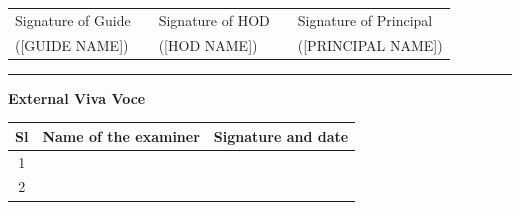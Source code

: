 \documentclass[../Project-Report-Main.tex]{subfiles}
\begin{document}
\noindent 
\begin{tabular}{p{1.75in} p{0.25in} p{1.75in} p{0.25in} p{1.75in}}
Signature of Guide & & Signature of HOD & & Signature of Principal \\
([GUIDE NAME]) & & ([HOD NAME]) & & ([PRINCIPAL NAME])
\end{tabular}

\vspace{0.1in}

\par\noindent\rule{\textwidth}{1pt}
\begin{center} \textbf{External Viva Voce} \end{center}

\begin{table}[htbp]
  \centering
   \begin{tabular}{|c|p{3in}|p{2in}|}
    \hline
    \multicolumn{1}{|l|}{Sl} & \multicolumn{1}{l|}{Name of the examiner} & \multicolumn{1}{l|}{Signature and date} \\
    \hline
    \multirow{2}[2]{*}{1} & \multirow{2}[2]{*}{} & \multirow{2}[2]{*}{} \\
          &       &  \\
   \hline
    \multirow{2}[2]{*}{2} & \multirow{2}[2]{*}{} & \multirow{2}[2]{*}{} \\
          &       &  \\
    \hline
    \end{tabular}%
  \label{tab:addlabel}%
\end{table}%
\end{document}
